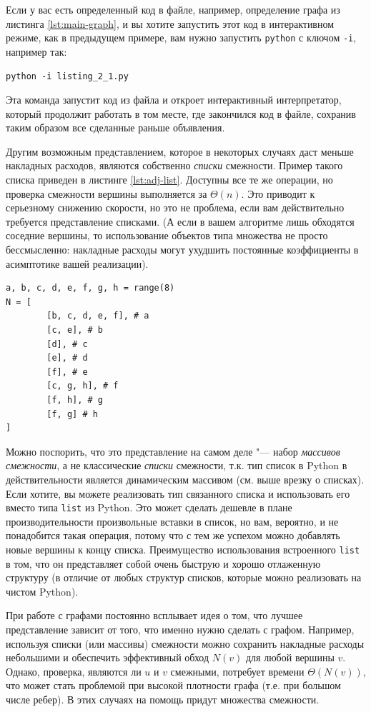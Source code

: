 \begin{note}[Совет:]
Если у вас есть определенный код в файле, например, определение графа из листинга \ref{lst:main-graph}, и вы хотите запустить этот код в интерактивном режиме, как в предыдущем примере, вам нужно запустить \texttt{python} с ключом \texttt{-i}, например так:

\texttt{python -i listing\_2\_1.py}

Эта команда запустит код из файла и откроет интерактивный интерпретатор, который продолжит работать в том месте, где закончился код в файле, сохранив таким образом все сделанные раньше объявления.
\end{note}

Другим возможным представлением, которое в некоторых случаях даст меньше накладных расходов, являются собственно \textit{списки} смежности. Пример такого списка приведен в листинге \ref{lst:adj-list}. Доступны все те же операции, но проверка смежности вершины выполняется за $\Theta(n)$. Это приводит к серьезному снижению скорости, но это не проблема, если вам действительно требуется представление списками. (А если в вашем алгоритме лишь обходятся соседние вершины, то использование объектов типа множества не просто бессмысленно: накладные расходы могут ухудшить постоянные коэффициенты в асимптотике вашей реализации).

\begin{lstlisting}[caption={Списки смежности}, label={lst:adj-list}]
a, b, c, d, e, f, g, h = range(8)
N = [
		[b, c, d, e, f], # a
		[c, e], # b
		[d], # c
		[e], # d
		[f], # e
		[c, g, h], # f
		[f, h], # g
		[f, g] # h
]
\end{lstlisting}

Можно поспорить, что это представление на самом деле "--- набор \textit{массивов смежности}, а не классические \textit{списки} смежности, т.к. тип список в Python в действительности является динамическим массивом (см. выше врезку о списках). Если хотите, вы можете реализовать тип связанного списка и использовать его вместо типа \texttt{list} из Python. Это может сделать дешевле в плане производительности произвольные вставки в список, но вам, вероятно, и не понадобится такая операция, потому что с тем же успехом можно добавлять новые вершины к концу списка. Преимущество использования встроенного \texttt{list} в том, что он представляет собой очень быструю и хорошо отлаженную структуру (в отличие от любых структур списков, которые можно реализовать на чистом Python).

При работе с графами постоянно всплывает идея о том, что лучшее представление зависит от того, что именно нужно сделать с графом. Например, используя списки (или массивы) смежности можно сохранить накладные расходы небольшими и обеспечить эффективный обход $N(v)$ для любой вершины $v$. Однако, проверка, являются ли $u$ и $v$ смежными, потребует времени $\Theta(N(v))$, что может стать проблемой при высокой плотности графа (т.е. при большом числе ребер). В этих случаях на помощь придут множества смежности. 


